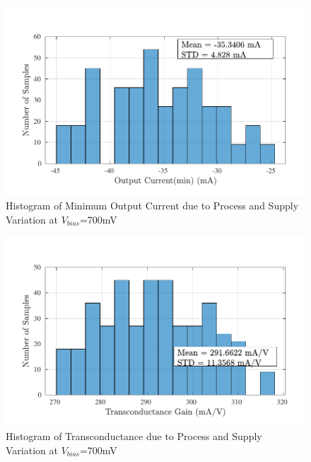 \begin{figure} [H]
\centering
\includegraphics[scale=1]{Figures/Corners/Overall/PV_Max/PDFs/PV_Max_imin.pdf}
\caption{Histogram of Minimum Output Current due to Process and Supply Variation at $V_{bias}$=700mV}
\end{figure}

\begin{figure} [H]
\centering
\includegraphics[scale=1]{Figures/Corners/Overall/PV_Max/PDFs/PV_Max_gm.pdf}
\caption{Histogram of Transconductance due to Process and Supply Variation at $V_{bias}$=700mV}
\end{figure}

